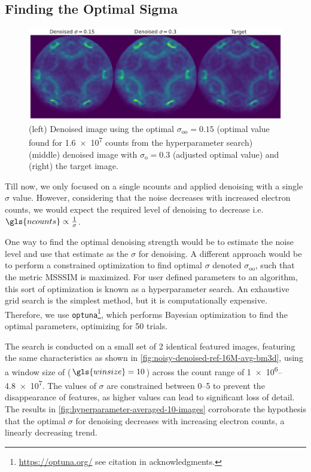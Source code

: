 \subsection{Finding the Optimal Sigma}
\begin{figure}
    \centering
    \includegraphics[width=1\linewidth]{images/denoised_optimal_sigma.pdf}
    \caption{(left) Denoised image using the optimal $\sigma_{\text{oo}}=0.15$ (optimal value found for \num{1.6e7} counts from the hyperparameter search) (middle) denoised image with $\sigma_{\text{o}}=0.3$ (adjusted optimal value) and (right) the target image.}
    \label{fig:denoised-optimal-sigma}
\end{figure}
Till now, we only focused on a single \gls{ncounts} and applied denoising with a single $\sigma$ value. However, considering that the noise decreases with increased electron counts, we would expect the required level of denoising to decrease i.e. $\gls{ncounts}\propto\frac{1}{\sigma}$.

One way to find the optimal denoising strength would be to estimate the noise level and use that estimate as the $\sigma$ for denoising. A different approach would be to perform a constrained optimization to find optimal $\sigma$ denoted $\sigma_{\text{oo}}$, such that the metric \gls{MSSSIM} is maximized. For user defined parameters to an algorithm, this sort of optimization is known as a hyperparameter search. An exhaustive grid search is the simplest method, but it is computationally expensive. Therefore, we use \texttt{optuna}\footnote{\href{https://optuna.org/}{https://optuna.org/} see citation in acknowledgments.}, which performs Bayesian optimization to find the optimal parameters, optimizing for \num{50} trials.

The search is conducted on a small set of \num{2} identical featured images, featuring the same characteristics as shown in \cref{fig:noisy-denoised-ref-16M-avg-bm3d}, using a window size of ($\gls{winsize} = \num{10}$) across the count range of \numrange{1e6}{4.8e7}. The values of $\sigma$ are constrained between \numrange{0}{5} to prevent the disappearance of features, as higher values can lead to significant loss of detail. The results in \cref{fig:hyperparameter-averaged-10-images} corroborate the hypothesis that the optimal $\sigma$ for denoising decreases with increasing electron counts, a linearly decreasing trend.

